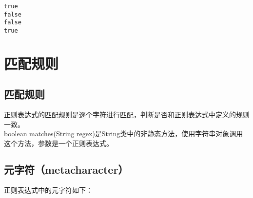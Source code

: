 \begin{tcolorbox}
	\begin{verbatim}
true
false
false
true
	\end{verbatim}
\end{tcolorbox}

\newpage

\section{匹配规则}

\subsection{匹配规则}

正则表达式的匹配规则是逐个字符进行匹配，判断是否和正则表达式中定义的规则一致。\\

boolean matches(String regex)是String类中的非静态方法，使用字符串对象调用这个方法，参数是一个正则表达式。\\

\subsection{元字符（metacharacter）}

正则表达式中的元字符如下：

